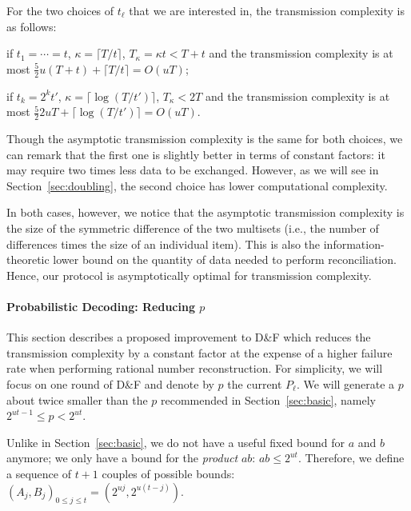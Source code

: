 \documentclass[twoside,envcountsame,runningheads]{llncs}
\newcommand{\df}{D\&F\xspace}
\begin{document}
For the two choices of $t_\ell$ that we are interested in, the transmission complexity is as follows:
\begin{compactitem}
\item if $t_1 = \cdots = t$, $\kappa = \lceil T/t \rceil$, $T_\kappa = \kappa t < T+t$ and the transmission complexity is at most $\frac{5}{2} u (T+t) + \lceil T/t \rceil = O(uT)$;
\item if $t_k = 2^k t'$, $\kappa = \lceil \log(T/t') \rceil$, $T_\kappa < 2T$ and the transmission complexity is at most $\frac{5}{2} 2uT + \lceil \log(T/t') \rceil = O(uT)$.
\end{compactitem}
Though the asymptotic transmission complexity is the same for both choices, we can remark that the first one is slightly better in terms of constant factors: it may require two times less data to be exchanged.
However, as we will see in Section~\ref{sec:doubling}, the second choice has lower computational complexity.

In both cases, however, we notice that the asymptotic transmission complexity is the size of the symmetric difference of the two multisets (i.e., the number of differences times the size of an individual item). This is also the information-theoretic lower bound on the quantity of data needed to perform reconciliation. Hence, our protocol is asymptotically optimal for transmission complexity.

\paragraph{Probabilistic Decoding: Reducing $p$}

This section describes a proposed improvement to \df which reduces the transmission complexity by a constant factor at the expense of a higher failure rate when performing rational number reconstruction. For simplicity, we will focus on one round of \df and denote by $p$ the current $P_\ell$. We will generate a $p$ about twice smaller than the $p$ recommended in Section~\ref{sec:basic}, namely
$2^{ut-1}\leq p < 2^{ut}$.

Unlike in Section~\ref{sec:basic}, we do not have a useful fixed bound for $a$ and $b$ anymore; we only have a bound for the \textit{product} $a b$: 
$ab \leq 2^{ut}$.
Therefore, we define a sequence of $t+1$ couples of possible bounds:
$\left(A_j, B_j\right)_{0 \leq j \leq t} = \left(2^{uj}, 2^{u(t-j)}\right)$.
\end{document}
